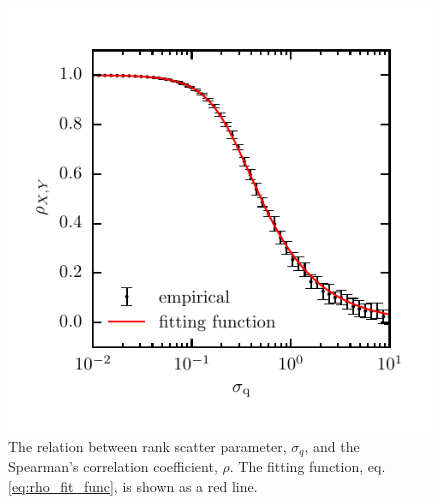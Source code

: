 \documentclass[a4paper,fleqn,usenatbib]{mnras}
\begin{document}
%
\begin{figure}
\includegraphics[]{figures/rho_sigma.pdf}
\caption{The relation between rank scatter parameter, $\sigma_q$, and the Spearman's correlation coefficient, $\rho$.  The fitting function, eq. \ref{eq:rho_fit_func}, is shown as a red line.}
\label{fig:rho_sigma}
\end{figure}
%

\bsp	%
\label{lastpage}
\end{document}
